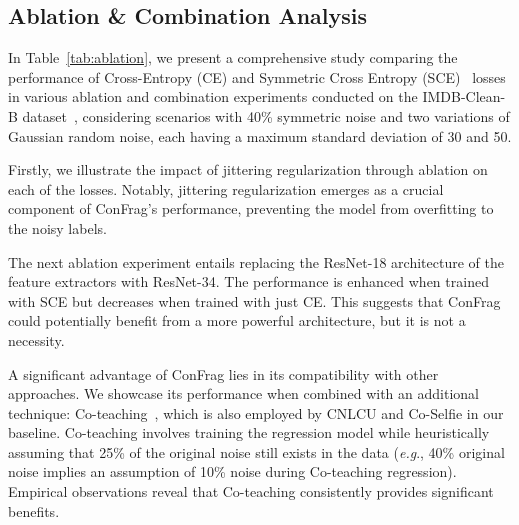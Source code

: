 \documentclass{article}
\def\eg{\textit{e.g}., } \def\Eg{\textit{E.g}., }
\theoremstyle{plain}
\theoremstyle{definition}
\theoremstyle{remark}
\begin{document}
\subsection{Ablation \& Combination Analysis}\label{subsec:ablation}
In Table~\ref{tab:ablation}, we present a comprehensive study comparing the performance of Cross-Entropy (CE) and Symmetric Cross Entropy (SCE)~\citep{wang19sce} losses in various ablation and combination experiments conducted on the IMDB-Clean-B dataset~\citep{lin2021imdbclean}, considering scenarios with 40\% symmetric noise and two variations of Gaussian random noise, each having a maximum standard deviation of 30 and 50.


Firstly, we illustrate the impact of jittering regularization through ablation on each of the losses.
Notably, jittering regularization emerges as a crucial component of ConFrag's performance, preventing the model from overfitting to the noisy labels.

The next ablation experiment entails replacing the ResNet-18 architecture of the feature extractors with ResNet-34.
The performance is enhanced when trained with SCE but decreases when trained with just CE.
This suggests that ConFrag could potentially benefit from a more powerful architecture, but it is not a necessity.

A significant advantage of ConFrag lies in its compatibility with other approaches. 
We showcase its performance when combined with an additional technique: Co-teaching~\citep{han18coteaching}, which is also employed by CNLCU and Co-Selfie in our baseline.
Co-teaching involves training the regression model while heuristically assuming that 25\% of the original noise still exists in the data (\eg 40\% original noise implies an assumption of 10\% noise during Co-teaching regression). 
Empirical observations reveal that Co-teaching consistently provides significant benefits. %
\end{document}
